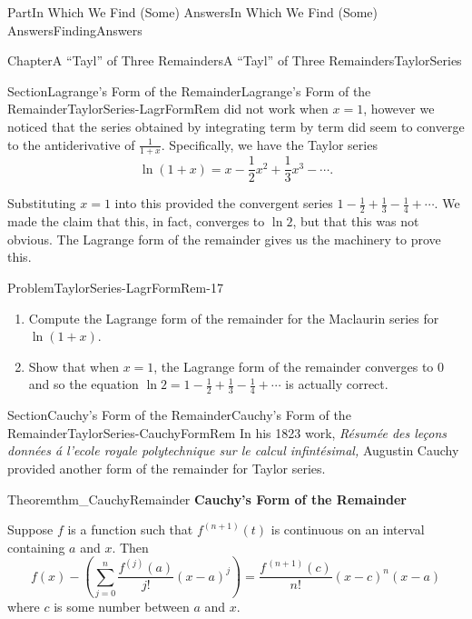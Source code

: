 \documentclass[oneside,10pt,]{book}
\newcommand{\terminology}[1]{\textbf{#1}}
\numberwithin{equation}{part}
\begin{document}
\begin{partptx}{Part}{In Which We Find (Some) Answers}{}{In Which We Find (Some) Answers}{}{}{FindingAnswers}
\begin{chapterptx}{Chapter}{A ``Tayl'' of Three Remainders}{}{A ``Tayl'' of Three Remainders}{}{}{TaylorSeries}
\begin{sectionptx}{Section}{Lagrange's Form of the Remainder}{}{Lagrange's Form of the Remainder}{}{}{TaylorSeries-LagrFormRem}
did not work when \(x=1\), however we noticed that the series obtained by integrating term by term did seem to converge to the antiderivative of \(\frac{1}{1+x}\). Specifically, we have the Taylor series%
\begin{equation*}
\ln\left(1+x\right)=x-\frac{1}{2}x^2+\frac{1}{3}x^3-\cdots\text{.}
\end{equation*}
%
\par
Substituting \(x=1\) into this provided the convergent series \(1-\frac{1}{2}+\frac{1}{3}-\frac{1}{4}+\cdots\). We made the claim that this, in fact, converges to \(\ln 2\), but that this was not obvious. The Lagrange form of the remainder gives us the machinery to prove this.%
\begin{problem}{Problem}{}{TaylorSeries-LagrFormRem-17}%
\begin{enumerate}[font=\bfseries,label=(\alph*),ref=\alph*]%
\item{}Compute the Lagrange form of the remainder for the Maclaurin series for \(\ln\left(1+x\right)\).%
\item{}Show that when \(x=1\), the Lagrange form of the remainder converges to \(0\) and so the equation \(\ln 2=1-\frac{1}{2}+\frac{1}{3}-\frac{1}{4}+\cdots\) is actually correct.%
\end{enumerate}%
\end{problem}
\end{sectionptx}
%
%
\typeout{************************************************}
\typeout{************************************************}
%
\begin{sectionptx}{Section}{Cauchy's Form of the Remainder}{}{Cauchy's Form of the Remainder}{}{}{TaylorSeries-CauchyFormRem}
In his 1823 work, \textit{Résumée des leçons données á l'ecole royale polytechnique sur le calcul infintésimal,} Augustin Cauchy  provided another form of the remainder for Taylor series.%
\begin{theorem}{Theorem}{}{}{thm_CauchyRemainder}%
\terminology{Cauchy's Form of the Remainder}%
\par
{} Suppose \(f\) is a function such that \(f^{(n+1)}(t)\) is continuous on an interval containing \(a\) and \(x\). Then%
\begin{equation*}
f(x)-\left(\sum_{j=0}^n\frac{f^{(j)}(a)}{j!}(x-a)^j\right)=\frac{f^{\, (n+1)}(c)}{n!}(x-c)^n(x-a)
\end{equation*}
where \(c\) is some number between \(a\) and \(x\).%

\end{theorem}
\end{sectionptx}
\end{chapterptx}
\end{partptx}
\end{document}
